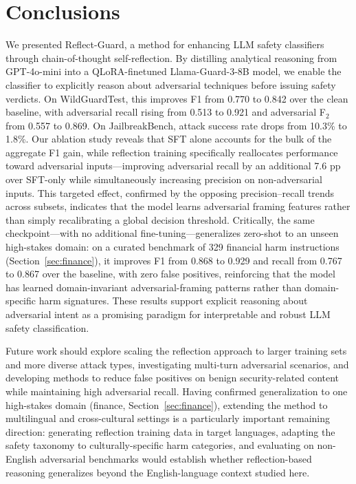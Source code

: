 \documentclass[ai,article,submit,pdftex,moreauthors]{Definitions/mdpi}
\begin{document}
\section{Conclusions}

We presented Reflect-Guard, a method for enhancing LLM safety classifiers through chain-of-thought self-reflection. By distilling analytical reasoning from GPT-4o-mini into a QLoRA-finetuned Llama-Guard-3-8B model, we enable the classifier to explicitly reason about adversarial techniques before issuing safety verdicts. On WildGuardTest, this improves F1 from 0.770 to 0.842 over the clean baseline, with adversarial recall rising from 0.513 to 0.921 and adversarial F$_2$ from 0.557 to 0.869. On JailbreakBench, attack success rate drops from 10.3\% to 1.8\%. Our ablation study reveals that SFT alone accounts for the bulk of the aggregate F1 gain, while reflection training specifically reallocates performance toward adversarial inputs---improving adversarial recall by an additional 7.6 pp over SFT-only while simultaneously increasing precision on non-adversarial inputs. This targeted effect, confirmed by the opposing precision--recall trends across subsets, indicates that the model learns adversarial framing features rather than simply recalibrating a global decision threshold. Critically, the same checkpoint---with no additional fine-tuning---generalizes zero-shot to an unseen high-stakes domain: on a curated benchmark of 329 financial harm instructions (Section~\ref{sec:finance}), it improves F1 from 0.868 to 0.929 and recall from 0.767 to 0.867 over the baseline, with zero false positives, reinforcing that the model has learned domain-invariant adversarial-framing patterns rather than domain-specific harm signatures. These results support explicit reasoning about adversarial intent as a promising paradigm for interpretable and robust LLM safety classification.

Future work should explore scaling the reflection approach to larger training sets and more diverse attack types, investigating multi-turn adversarial scenarios, and developing methods to reduce false positives on benign security-related content while maintaining high adversarial recall. Having confirmed generalization to one high-stakes domain (finance, Section~\ref{sec:finance}), extending the method to multilingual and cross-cultural settings is a particularly important remaining direction: generating reflection training data in target languages, adapting the safety taxonomy to culturally-specific harm categories, and evaluating on non-English adversarial benchmarks would establish whether reflection-based reasoning generalizes beyond the English-language context studied here.
\end{document}
